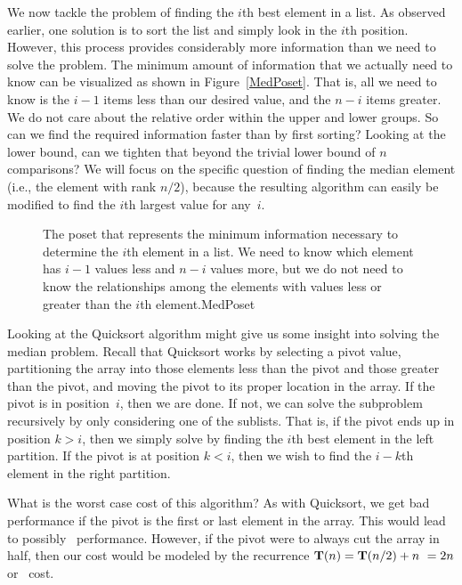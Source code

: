 We now tackle the problem of finding the \(i\)th best element in a
list.
As observed earlier, one solution is to sort the list and simply look
in the \(i\)th position.
However, this process provides considerably more information than we
need to solve the problem.
The minimum amount of information that we actually need to know can be
visualized as shown in Figure~\ref{MedPoset}.
That is, all we need to know is the \(i-1\) items less than our
desired value, and the \(n-i\) items greater.
We do not care about the relative order within the upper and lower
groups.
So can we find the required information faster than by first sorting?
Looking at the lower bound, can we tighten that beyond the
trivial lower bound of \(n\) comparisons?
We will focus on the specific question of finding the median element
(i.e., the element with rank \(n/2\)), because the resulting algorithm
can easily be modified to find the \(i\)th largest value for any~\(i\).

\begin{figure}
{The poset that represents the minimum information necessary to
determine the \(i\)th element in a list.
We need to know which element has \(i-1\) values less and \(n-i\)
values more, but we do not need to know the relationships among the
elements with values less or greater than the \(i\)th element.}{MedPoset}
\bigskip
\end{figure}

Looking at the Quicksort algorithm might give us some insight into
solving the median problem.
Recall that Quicksort works by selecting a pivot value, partitioning
the array into those elements less than the pivot and those greater
than the pivot, and moving the pivot to its proper location in the
array.
If the pivot is in position~\(i\), then we are done.
If not, we can solve the subproblem recursively by only considering
one of the sublists.
That is, if the pivot ends up in position \(k > i\), then we simply
solve by finding the \(i\)th best element in the left partition.
If the pivot is at position \(k < i\), then we wish to find the
\(i-k\)th element in the right partition.

What is the worst case cost of this algorithm?
As with Quicksort, we get bad performance if the pivot is the first or
last element in the array.
This would lead to possibly \Ontwo\ performance.
However, if the pivot were to always cut the array in half, then our
cost would be modeled by the recurrence \(\mbox{$\textbf{T}(n)$} = {\bf T}(n/2) + n\ =
2n\) or \On\ cost.

